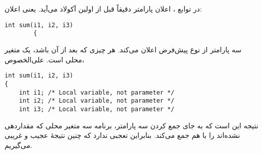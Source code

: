 \section{}
\paragraph{}\label{answer:94}
در توابع ، اعلان پارامتر دقیقاً قبل از اولین آکولاد می‌آید. یعنی اعلان:
\begin{LTR}
    \begin{lstlisting}[style=C++Style]
        int sum(i1, i2, i3)
        {
    \end{lstlisting}
\end{LTR}

سه پارامتر از نوع پیش‌فرض  اعلان می‌کند. هر چیزی که بعد از آن باشد، یک متغیر محلی است. علی‌الخصوص،
\begin{LTR}
\begin{lstlisting}[style=C++Style]
int sum(i1, i2, i3)
{
    int i1; /* Local variable, not parameter */
    int i2; /* Local variable, not parameter */
    int i3; /* Local variable, not parameter */
\end{lstlisting}
\end{LTR}

نتیجه این است که به جای جمع کردن سه پارامتر، برنامه سه متغیر محلی که مقداردهی نشده‌اند را با هم جمع می‌کند. بنابراین تعجبی ندارد که چنین نتیجهٔ عجیب و غریبی می‌گیریم.